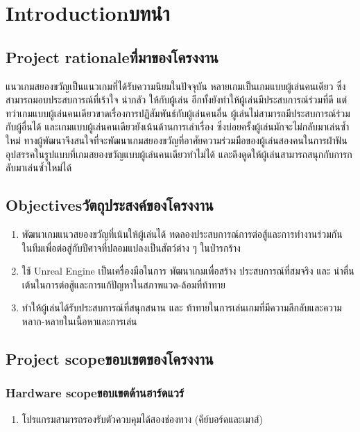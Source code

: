 \chapter{\ifenglish Introduction\else บทนำ\fi}

\section{\ifenglish Project rationale\else ที่มาของโครงงาน\fi}
แนวเกมสยองขวัญเป็นแนวเกมที่ได้รับความนิยมในปัจจุบัน หลายเกมเป็นเกมแบบผู้เล่นคนเดียว ซึ่งสามารถมอบประสบการณ์ที่เร้าใจ น่ากลัว ให้กับผู้เล่น อีกทั้งยังทำให้ผู้เล่นมีประสบการณ์ร่วมที่ดี แต่ทว่าเกมแบบผู้เล่นคนเดียวขาดเรื่องการปฏิสัมพันธ์กับผู้เล่นคนอื่น ผู้เล่นไม่สามารถมีประสบการณ์ร่วมกับผู้อื่นได้ และเกมแบบผู้เล่นคนเดียวยังเน้นด้านการเล่าเรื่อง ซึ่งบ่อยครั้งผู้เล่นมักจะไม่กลับมาเล่นซ้ำใหม่ ทางผู้พัฒนาจึงสนใจที่จะพัฒนาเกมสยองขวัญที่อาศัยความร่วมมือของผู้เล่นสองคนในการฝ่าฟันอุปสรรคในรูปแบบที่เกมสยองขวัญแบบผู้เล่นคนเดียวทำไม่ได้ และดึงดูดให้ผู้เล่นสามารถสนุกกับการกลับมาเล่นซ้ำใหม่ได้

\section{\ifenglish Objectives\else วัตถุประสงค์ของโครงงาน\fi}
\begin{enumerate}
    \item พัฒนาเกมแนวสยองขวัญที่เน้นให้ผู้เล่นได้ ทดลองประสบการณ์การต่อสู้และการทำงานร่วมกัน ในทีมเพื่อต่อสู่กับปีศาจที่ปลอมแปลงเป็นสัตว์ต่าง ๆ ในป่ารกร้าง
    \item ใช้ Unreal Engine เป็นเครื่องมือในการ พัฒนาเกมเพื่อสร้าง ประสบการณ์ที่สมจริง และ น่าตื่นเต้นในการต่อสู้และการแก้ปัญหาในสภาพแวด-ล้อมที่ท้าทาย
    \item ทำให้ผู้เล่นได้รับประสบการณ์ที่สนุกสนาน และ ท้าทายในการเล่นเกมที่มีความลึกลับและความหลาก-หลายในเนื้อหาและการเล่น
\end{enumerate}

\section{\ifenglish Project scope\else ขอบเขตของโครงงาน\fi}

\subsection{\ifenglish Hardware scope\else ขอบเขตด้านฮาร์ดแวร์\fi}
\begin{enumerate}
    \item โปรแกรมสามารถรองรับตัวควบคุมได้สองช่องทาง (คีย์บอร์ดและเมาส์)
\end{enumerate}

